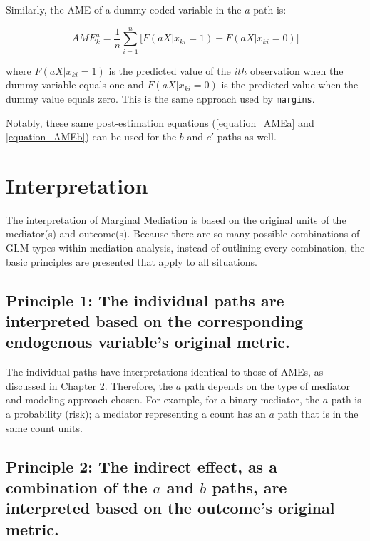 \documentclass[]{DissertateUSU}
\begin{document}
Similarly, the AME of a dummy coded variable in the \(a\) path is:

\begin{equation}\label{equation_AMEb}
AME_{k}^a = \frac{1}{n} \sum_{i=1}^{n} \big[ F(a X | x_{ki} = 1) - F(a X | x_{ki} = 0) \big]
\end{equation}

\noindent where \(F(a X | x_{ki} = 1)\) is the predicted value of the
\(ith\) observation when the dummy variable equals one and
\(F(a X | x_{ki} = 0)\) is the predicted value when the dummy value
equals zero. This is the same approach used by \texttt{margins}.

Notably, these same post-estimation equations (\ref{equation_AMEa} and
\ref{equation_AMEb}) can be used for the \(b\) and \(c'\) paths as well.

\section{Interpretation}\label{interpretation-1}

The interpretation of Marginal Mediation is based on the original units
of the mediator(s) and outcome(s). Because there are so many possible
combinations of GLM types within mediation analysis, instead of
outlining every combination, the basic principles are presented that
apply to all situations.

\subsection{Principle 1: The individual paths are interpreted based on
the corresponding endogenous variable's original
metric.}\label{principle-1-the-individual-paths-are-interpreted-based-on-the-corresponding-endogenous-variables-original-metric.}

The individual paths have interpretations identical to those of AMEs, as
discussed in Chapter 2. Therefore, the \(a\) path depends on the type of
mediator and modeling approach chosen. For example, for a binary
mediator, the \(a\) path is a probability (risk); a mediator
representing a count has an \(a\) path that is in the same count units.

\subsection{\texorpdfstring{Principle 2: The indirect effect, as a
combination of the \(a\) and \(b\) paths, are interpreted based on the
outcome's original
metric.}{Principle 2: The indirect effect, as a combination of the a and b paths, are interpreted based on the outcome's original metric.}}\label{principle-2-the-indirect-effect-as-a-combination-of-the-a-and-b-paths-are-interpreted-based-on-the-outcomes-original-metric.}
\end{document}
